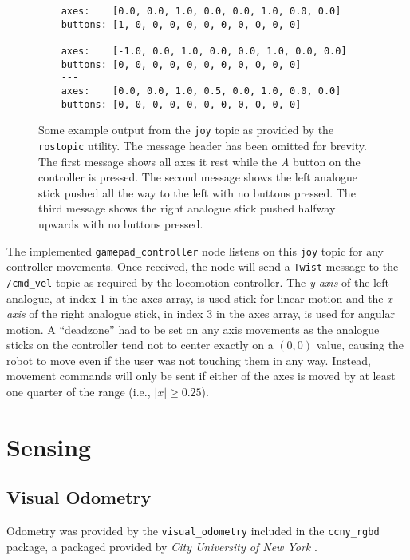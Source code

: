 \begin{figure}[!h]
	\centering
	\begin{lstlisting}
	axes:    [0.0, 0.0, 1.0, 0.0, 0.0, 1.0, 0.0, 0.0]
	buttons: [1, 0, 0, 0, 0, 0, 0, 0, 0, 0, 0]
	---
	axes:    [-1.0, 0.0, 1.0, 0.0, 0.0, 1.0, 0.0, 0.0]
	buttons: [0, 0, 0, 0, 0, 0, 0, 0, 0, 0, 0]
	---
	axes:    [0.0, 0.0, 1.0, 0.5, 0.0, 1.0, 0.0, 0.0]
	buttons: [0, 0, 0, 0, 0, 0, 0, 0, 0, 0, 0]
	\end{lstlisting}
	\caption{Some example output from the \texttt{joy} topic as provided by the \texttt{rostopic} utility. The message header has been omitted for brevity. The first message shows all axes it rest while the \emph{A} button on the controller is pressed. The second message shows the left analogue stick pushed all the way to the left with no buttons pressed. The third message shows the right analogue stick pushed halfway upwards with no buttons pressed.}
	\label{fig:joy_example}
\end{figure}

The implemented \texttt{gamepad\_controller} node listens on this \texttt{joy} topic for any controller movements. Once received, the node will send a \texttt{Twist} message to the \texttt{/cmd\_vel} topic as required by the locomotion controller. The \emph{y axis} of the left analogue, at index 1 in the axes array, is used stick for linear motion and the \emph{x axis} of the right analogue stick, in index 3 in the axes array, is used for angular motion. A ``deadzone'' had to be set on any axis movements as the analogue sticks on the controller tend not to center exactly on a $(0, 0)$ value, causing the robot to move even if the user was not touching them in any way. Instead, movement commands will only be sent if either of the axes is moved by at least one quarter of the range (i.e., $|x| \geq 0.25$).


\section{Sensing}

\subsection{Visual Odometry}

Odometry was provided by the \texttt{visual\_odometry} included in the \texttt{ccny\_rgbd} package, a packaged provided by \emph{City University of New York} \cite{ccny_rgbd}.

